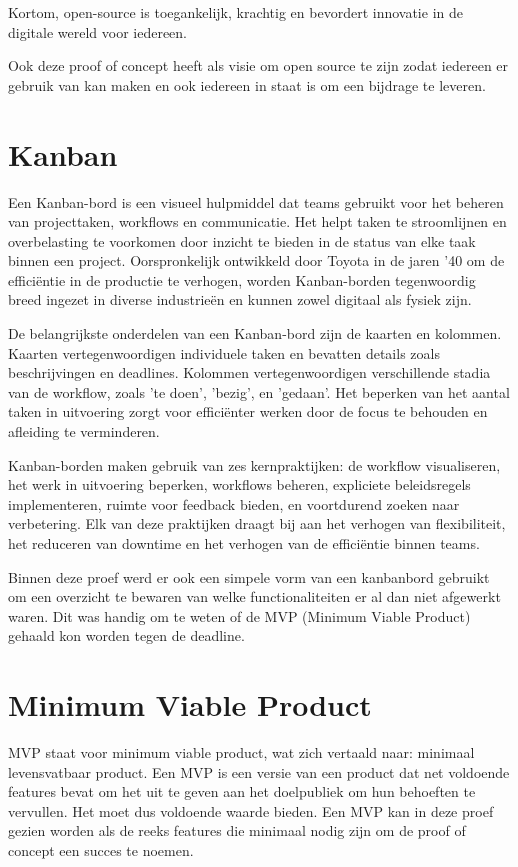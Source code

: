 Kortom, open-source is toegankelijk, krachtig en bevordert innovatie in de digitale wereld voor iedereen.\autocite{OpenSource2006}

Ook deze proof of concept heeft als visie om open source te zijn zodat iedereen er gebruik van kan maken en ook iedereen in staat is om een bijdrage te leveren.

\section{Kanban}
Een Kanban-bord is een visueel hulpmiddel dat teams gebruikt voor het beheren van projecttaken, workflows en communicatie. Het helpt taken te stroomlijnen en overbelasting te voorkomen door inzicht te bieden in de status van elke taak binnen een project. Oorspronkelijk ontwikkeld door Toyota in de jaren '40 om de efficiëntie in de productie te verhogen, worden Kanban-borden tegenwoordig breed ingezet in diverse industrieën en kunnen zowel digitaal als fysiek zijn.

De belangrijkste onderdelen van een Kanban-bord zijn de kaarten en kolommen. Kaarten vertegenwoordigen individuele taken en bevatten details zoals beschrijvingen en deadlines. Kolommen vertegenwoordigen verschillende stadia van de workflow, zoals 'te doen', 'bezig', en 'gedaan'. Het beperken van het aantal taken in uitvoering zorgt voor efficiënter werken door de focus te behouden en afleiding te verminderen.

Kanban-borden maken gebruik van zes kernpraktijken: de workflow visualiseren, het werk in uitvoering beperken, workflows beheren, expliciete beleidsregels implementeren, ruimte voor feedback bieden, en voortdurend zoeken naar verbetering. Elk van deze praktijken draagt bij aan het verhogen van flexibiliteit, het reduceren van downtime en het verhogen van de efficiëntie binnen teams.\autocite{Hennigan2024}

Binnen deze proef werd er ook een simpele vorm van een kanbanbord gebruikt om een overzicht te bewaren van welke functionaliteiten er al dan niet afgewerkt waren. Dit was handig om te weten of de MVP (Minimum Viable Product) gehaald kon worden tegen de deadline.

\section{Minimum Viable Product}
MVP staat voor minimum viable product, wat zich vertaald naar: minimaal levensvatbaar product. Een MVP is een versie van een product dat net voldoende features bevat om het uit te geven aan het doelpubliek om hun behoeften te vervullen. Het moet dus voldoende waarde bieden. \autocite{VanTellingen2022}
Een MVP kan in deze proef gezien worden als de reeks features die minimaal nodig zijn om de proof of concept een succes te noemen.

